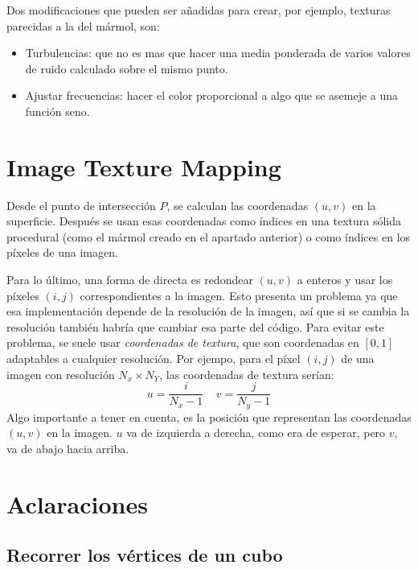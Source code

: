 Dos modificaciones que pueden ser añadidas para crear, por ejemplo, texturas parecidas a la del mármol, son:

\begin{itemize}
\item Turbulencias: que no es mas que hacer una media ponderada de varios valores de ruido calculado sobre el mismo punto.
\item Ajustar frecuencias: hacer el color proporcional a algo que se asemeje a una función seno.
\end{itemize}

\section{Image Texture Mapping}

Desde el punto de intersección $P$, se calculan las coordenadas $(u,v)$ en la superficie. Después se usan esas coordenadas como índices en una textura sólida procedural (como el mármol creado en el apartado anterior) o como índices en los píxeles de una imagen.

Para lo último, una forma de directa es redondear $(u,v)$ a enteros y usar los píxeles $(i,j)$ correspondientes a la imagen. Esto presenta un problema ya que esa implementación depende de la resolución de la imagen, así que si se cambia la resolución también habría que cambiar esa parte del código. Para evitar este problema, se suele usar \textit{coordenadas de textura}, que son coordenadas en $[0,1]$  adaptables a cualquier resolución. Por ejempo, para el píxel $(i,j)$ de una imagen con resolución $N_x\times N_Y$, las coordenadas de textura serían:
\[
u=\frac{i}{N_x-1} \;\;\;\; v=\frac{j}{N_y-1}
\]
Algo importante a tener en cuenta, es la posición que representan las coordenadas $(u,v)$ en la imagen. $u$ va de izquierda a derecha, como era de esperar, pero $v$, va de abajo hacia arriba.


\newpage

\appendix

\section{Aclaraciones}

\subsection{Recorrer los vértices de un cubo}

